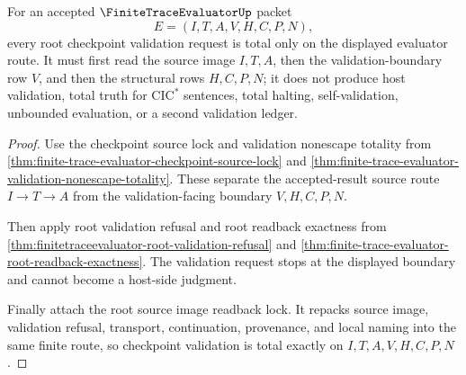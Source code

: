 \begin{theorem}
\label{thm:finitetrace-evaluator-root-checkpoint-validation-totality}
For an accepted $\FiniteTraceEvaluatorUp$ packet
$$
E=(I,T,A,V,H,C,P,N),
$$
every root checkpoint validation request is total only on the displayed evaluator route. It must first read the source image $I,T,A$, then the validation-boundary row $V$, and then the structural rows $H,C,P,N$; it does not produce host validation, total truth for $\mathrm{CIC}^{*}$ sentences, total halting, self-validation, unbounded evaluation, or a second validation ledger.
\end{theorem}
\begin{proof}
Use the checkpoint source lock and validation nonescape totality from \autoref{thm:finite-trace-evaluator-checkpoint-source-lock} and \autoref{thm:finite-trace-evaluator-validation-nonescape-totality}. These separate the accepted-result source route $I \to T \to A$ from the validation-facing boundary $V,H,C,P,N$.

Then apply root validation refusal and root readback exactness from \autoref{thm:finitetraceevaluator-root-validation-refusal} and \autoref{thm:finite-trace-evaluator-root-readback-exactness}. The validation request stops at the displayed boundary and cannot become a host-side judgment.

Finally attach the root source image readback lock. It repacks source image, validation refusal, transport, continuation, provenance, and local naming into the same finite route, so checkpoint validation is total exactly on $I,T,A,V,H,C,P,N$.
\end{proof}

